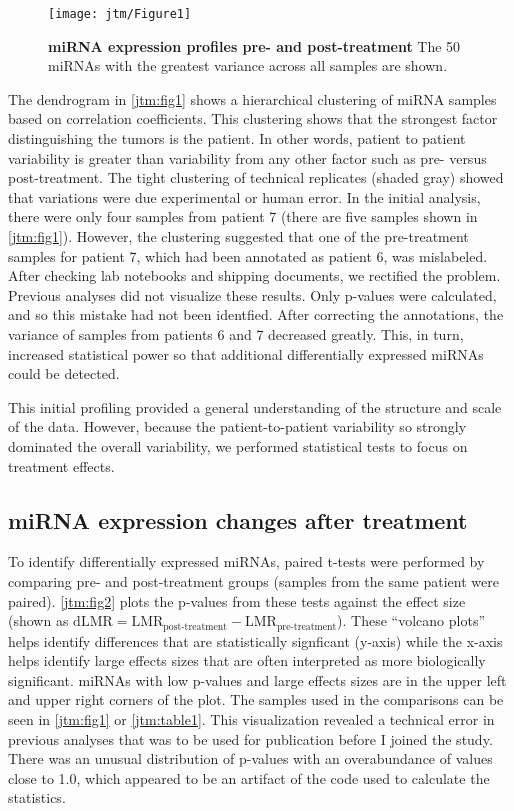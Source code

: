 \begin{figure}[h!]
  \centering
  \texttt{[image: jtm/Figure1]}
  \caption[miRNA expression profiles pre- and post-treatment]{
       \textbf{miRNA expression profiles pre- and post-treatment}
       The 50 miRNAs with the greatest variance across all samples are shown.
  }
  \label{jtm:fig1}
\end{figure}

The dendrogram in \autoref{jtm:fig1} shows a hierarchical
clustering of miRNA samples based on correlation coefficients. 
This clustering shows that the strongest
factor distinguishing the tumors is the patient. In other words, patient to patient
variability is greater than variability from any other factor such as pre- versus post-treatment.
The tight clustering of technical replicates (shaded gray) showed that variations
were due experimental or human error.
In the initial analysis, there were only four 
samples from patient 7 (there are five samples
shown in \autoref{jtm:fig1}). However, the clustering suggested
 that one of the pre-treatment samples for patient
7, which had been annotated as patient 6, was mislabeled. After checking lab notebooks
and shipping documents, we rectified the problem. Previous analyses did not visualize these results.
Only p-values were calculated, and so this mistake had not been identfied. After correcting
the annotations, the variance of samples from patients 6 and 7 decreased greatly.
This, in turn, increased statistical power so that additional differentially expressed miRNAs could
be detected.

This initial profiling provided a general understanding of the structure and scale
of the data. However, because the patient-to-patient variability so strongly
dominated the overall variability, we performed statistical tests to focus
on treatment effects.

\subsection{miRNA expression changes after treatment}

To identify differentially expressed miRNAs, paired t-tests were
performed by comparing pre- and post-treatment groups (samples from
the same patient were paired). \autoref{jtm:fig2} plots the p-values
from these tests against the effect size (shown as $\text{dLMR} =
\text{LMR}_{\text{post-treatment}} - \text{LMR}_{\text{pre-treatment}}$).
These ``volcano plots'' helps identify differences that are statistically
signficant (y-axis) while the x-axis helps identify large effects sizes
that are often interpreted as more biologically significant. miRNAs with
low p-values and large effects sizes are in the upper left and upper right
corners of the plot. The samples used in the comparisons can be
seen in \autoref{jtm:fig1} or \autoref{jtm:table1}. This visualization revealed
a technical error in previous analyses that was to be used for publication before
I joined the study. There was an unusual distribution of p-values with
an overabundance of values close to 1.0, which appeared to be an artifact of the code used
to calculate the statistics.


